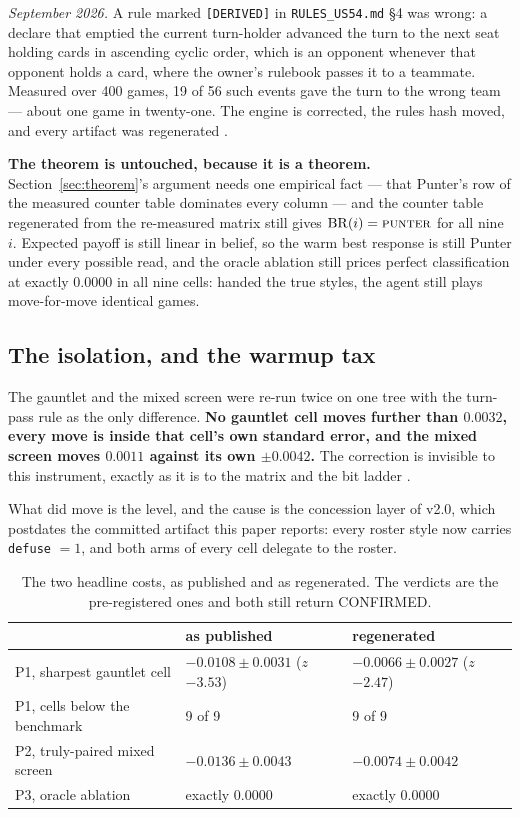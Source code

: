 \documentclass[11pt]{article}
\newcommand{\code}[1]{\texttt{#1}}
\begin{document}
\emph{September 2026.} A rule marked \code{[DERIVED]} in \code{RULES\_US54.md} \S4 was wrong: a
declare that emptied the current turn-holder advanced the turn to the next seat holding cards in
ascending cyclic order, which is an opponent whenever that opponent holds a card, where the
owner's rulebook passes it to a teammate. Measured over 400 games, 19 of 56 such events gave the
turn to the wrong team --- about one game in twenty-one. The engine is corrected, the rules hash
moved, and every artifact was regenerated \cite{rules}.

\textbf{The theorem is untouched, because it is a theorem.} Section~\ref{sec:theorem}'s argument
needs one empirical fact --- that Punter's row of the measured counter table dominates every
column --- and the counter table regenerated from the re-measured matrix still gives
$\mathrm{BR}(i) = \textsc{punter}$ for all nine $i$. Expected payoff is still linear in belief, so
the warm best response is still Punter under every possible read, and the oracle ablation still
prices perfect classification at exactly $0.0000$ in all nine cells: handed the true styles, the
agent still plays move-for-move identical games.

\subsection{The isolation, and the warmup tax}

The gauntlet and the mixed screen were re-run twice on one tree with the turn-pass rule as the only
difference. \textbf{No gauntlet cell moves further than $0.0032$, every move is inside that cell's
own standard error, and the mixed screen moves $0.0011$ against its own $\pm 0.0042$.} The
correction is invisible to this instrument, exactly as it is to the matrix and the bit ladder
\cite{v05paper, matrixv2}.

What did move is the level, and the cause is the concession layer of v2.0, which
postdates the committed artifact this paper reports: every roster style now carries \code{defuse}
$=1$, and both arms of every cell delegate to the roster.

\begin{table}[t]
\centering
\caption{The two headline costs, as published and as regenerated. The verdicts are the
pre-registered ones and both still return CONFIRMED.}
\label{tab:addv10}
\footnotesize
\begin{tabular}{@{}lll@{}}
\toprule
 & as published & regenerated \\
\midrule
P1, sharpest gauntlet cell & $-0.0108 \pm 0.0031$ ($z$ $-3.53$) & $-0.0066 \pm 0.0027$ ($z$ $-2.47$) \\
P1, cells below the benchmark & 9 of 9 & 9 of 9 \\
P2, truly-paired mixed screen & $-0.0136 \pm 0.0043$ & $-0.0074 \pm 0.0042$ \\
P3, oracle ablation & exactly $0.0000$ & exactly $0.0000$ \\
\bottomrule
\end{tabular}
\end{table}
\end{document}
